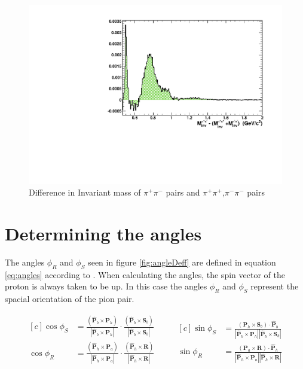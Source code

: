 \documentclass[abstract = on,listof=totoc, bibliography=totoc]{scrreprt}
\newcommand{\phir}{\phi_{R}}
\newcommand{\phis}{\phi_{S}}
\newcommand{\pip}{\pi^+}
\newcommand{\pim}{\pi^-}
\newcommand{\pair}{$\pip\pim$ }
\begin{document}
\begin{figure}
\begin{center}
\includegraphics[width = 1\textwidth]{diffInvMassSameOpp2}
\caption[Difference in the invariant mass of opposite and same sign pion pairs]{Difference in Invariant mass of \pair pairs and $\pi^+\pi^+$,$\pi^-\pi^-$ pairs}
\label{fig:dInvMSO}
\end{center}
\end{figure}



\section{Determining the angles}

The angles $\phir$ and $\phis$ seen in figure \ref{fig:angleDeff} are defined in equation \ref{eq:angles} according to \cite{bacchettaRedici2}. When calculating the angles, the spin vector of the proton is always taken to be up. In this case the angles $\phir$ and $\phis$ represent the spacial orientation of the pion pair.  

\begin{equation}
\label{eq:angles}
\begin{aligned}[c]
\cos\phi_S &= \frac{(\bm{\hat{P}}_b \times \bm{P}_h)}{|\bm{\hat{P}}_b \times \bm{P}_h|} \cdot \frac{(\bm{\hat{P}}_b \times \bm{S}_b)}{|\bm{\hat{P}}_b \times \bm{S}_b|} \\
\cos\phi_R &= \frac{(\bm{\hat{P}}_h \times \bm{P}_a)}{|\bm{\hat{P}}_h \times \bm{P}_a|} \cdot \frac{(\bm{\hat{P}}_h \times \bm{R})}{|\bm{\hat{P}}_h \times \bm{R}|} \\
\end{aligned}
\qquad
\begin{aligned}[c]
\sin\phi_S &= \frac{(\bm{P}_h \times \bm{S}_b) \cdot \bm{\hat{P}}_b}{|\bm{\hat{P}}_b \times \bm{P}_h| |\bm{\hat{P}}_b \times \bm{S}_b|} \\
\sin\phi_R &= \frac{(\bm{P}_a \times \bm{R}) \cdot \bm{\hat{P}}_h}{|\bm{\hat{P}}_h \times \bm{P}_a| |\bm{\hat{P}}_h \times \bm{R}|} 
\end{aligned}
\end{equation}\\
\end{document}
